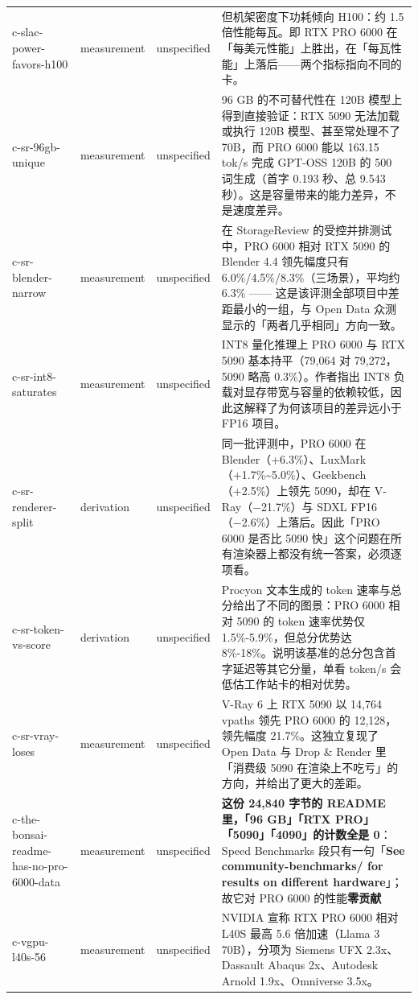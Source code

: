 \begin{table}[t]
\begin{tabularx}{\textwidth}{XllX}
c-slac-power-favors-h100 & measurement & unspecified & \sym{⚠}{} 但机架密度下功耗倾向 H100：约 1.5 倍性能每瓦。即 RTX PRO 6000 在「每美元性能」上胜出，在「每瓦性能」上落后——两个指标指向不同的卡。 \\
c-sr-96gb-unique & measurement & unspecified & 96 GB 的不可替代性在 120B 模型上得到直接验证：RTX 5090 无法加载或执行 120B 模型、甚至常处理不了 70B，而 PRO 6000 能以 163.15 tok/s 完成 GPT-OSS 120B 的 500 词生成（首字 0.193 秒、总 9.543 秒）。这是容量带来的能力差异，不是速度差异。 \\
c-sr-blender-narrow & measurement & unspecified & 在 StorageReview 的受控并排测试中，PRO 6000 相对 RTX 5090 的 Blender 4.4 领先幅度只有 6.0\%/4.5\%/8.3\%（三场景），平均约 6.3\% —— 这是该评测全部项目中差距最小的一组，与 Open Data 众测显示的「两者几乎相同」方向一致。 \\
c-sr-int8-saturates & measurement & unspecified & INT8 量化推理上 PRO 6000 与 RTX 5090 基本持平（79,064 对 79,272，5090 略高 0.3\%）。作者指出 INT8 负载对显存带宽与容量的依赖较低，因此这解释了为何该项目的差异远小于 FP16 项目。 \\
c-sr-renderer-split & derivation & unspecified & 同一批评测中，PRO 6000 在 Blender（+6.3\%）、LuxMark（+1.7\%\textasciitilde{}5.0\%）、Geekbench（+2.5\%）上领先 5090，却在 V-Ray（−21.7\%）与 SDXL FP16（−2.6\%）上落后。因此「PRO 6000 是否比 5090 快」这个问题在所有渲染器上都没有统一答案，必须逐项看。 \\
c-sr-token-vs-score & derivation & unspecified & Procyon 文本生成的 token 速率与总分给出了不同的图景：PRO 6000 相对 5090 的 token 速率优势仅 1.5\%-5.9\%，但总分优势达 8\%-18\%。说明该基准的总分包含首字延迟等其它分量，单看 token/s 会低估工作站卡的相对优势。 \\
c-sr-vray-loses & measurement & unspecified & V-Ray 6 上 RTX 5090 以 14,764 vpaths 领先 PRO 6000 的 12,128，领先幅度 21.7\%。这独立复现了 Open Data 与 Drop \& Render 里「消费级 5090 在渲染上不吃亏」的方向，并给出了更大的差距。 \\
c-the-bonsai-readme-has-no-pro-6000-data & measurement & unspecified & \sym{⚠}{}\sym{⚠}{}\sym{⚠}{} \textbf{这份 24,840 字节的 README 里，「96 GB」「RTX PRO」「5090」「4090」的计数全是 0}： Speed Benchmarks 段只有一句「\textbf{See community-benchmarks/ for results on different hardware}」； 故它对 PRO 6000 的性能\textbf{零贡献} \\
c-vgpu-l40s-56 & measurement & unspecified & NVIDIA 宣称 RTX PRO 6000 相对 L40S 最高 5.6 倍加速（Llama 3 70B），分项为 Siemens UFX 2.3x、Dassault Abaqus 2x、Autodesk Arnold 1.9x、Omniverse 3.5x。 \\
\bottomrule
\end{tabularx}
\end{table}

